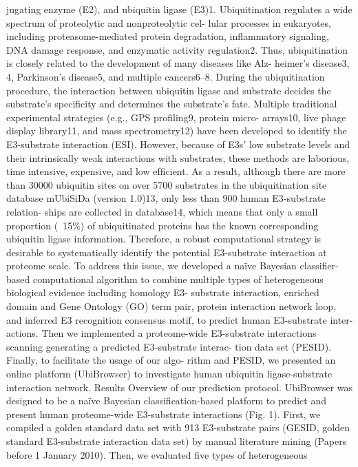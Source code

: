 jugating enzyme (E2), and ubiquitin ligase (E3)1. Ubiquitination
regulates a wide spectrum of proteolytic and nonproteolytic cel-
lular processes in eukaryotes, including proteasome-mediated
protein degradation, inﬂammatory signaling, DNA damage
response, and enzymatic activity regulation2. Thus, ubiquitination
is closely related to the development of many diseases like Alz-
heimer’s disease3, 4, Parkinson’s disease5, and multiple cancers6–8.
During the ubiquitination procedure, the interaction between
ubiquitin ligase and substrate decides the substrate’s speciﬁcity
and
determines
the
substrate’s
fate.
Multiple
traditional
experimental strategies (e.g., GPS proﬁling9, protein micro-
arrays10, live phage display library11, and mass spectrometry12)
have been developed to identify the E3-substrate interaction
(ESI). However, because of E3s’ low substrate levels and their
intrinsically weak interactions with substrates, these methods are
laborious, time intensive, expensive, and low efﬁcient. As a result,
although there are more than 30000 ubiquitin sites on over
5700 substrates in the ubiquitination site database mUbiSiDa
(version 1.0)13, only less than 900 human E3-substrate relation-
ships are collected in database14, which means that only a small
proportion (~15\%) of ubiquitinated proteins has the known
corresponding ubiquitin ligase information. Therefore, a robust
computational strategy is desirable to systematically identify the
potential E3-substrate interaction at proteome scale.
To
address
this
issue,
we
developed
a
naïve
Bayesian
classiﬁer-based computational algorithm to combine multiple types
of heterogeneous biological evidence including homology E3-
substrate interaction, enriched domain and Gene Ontology (GO)
term pair, protein interaction network loop, and inferred E3
recognition consensus motif, to predict human E3-substrate inter-
actions. Then we implemented a proteome-wide E3-substrate
interactions scanning generating a predicted E3-substrate interac-
tion data set (PESID). Finally, to facilitate the usage of our algo-
rithm and PESID, we presented an online platform (UbiBrowser) to
investigate human ubiquitin ligase-substrate interaction network.
Results
Overview of our prediction protocol. UbiBrowser was designed
to be a naïve Bayesian classiﬁcation-based platform to predict and
present human proteome-wide E3-substrate interactions (Fig. 1).
First, we compiled a golden standard data set with 913
E3-substrate
pairs
(GESID,
golden
standard
E3-substrate
interaction data set) by manual literature mining (Papers before
1 January 2010). Then, we evaluated ﬁve types of heterogeneous
